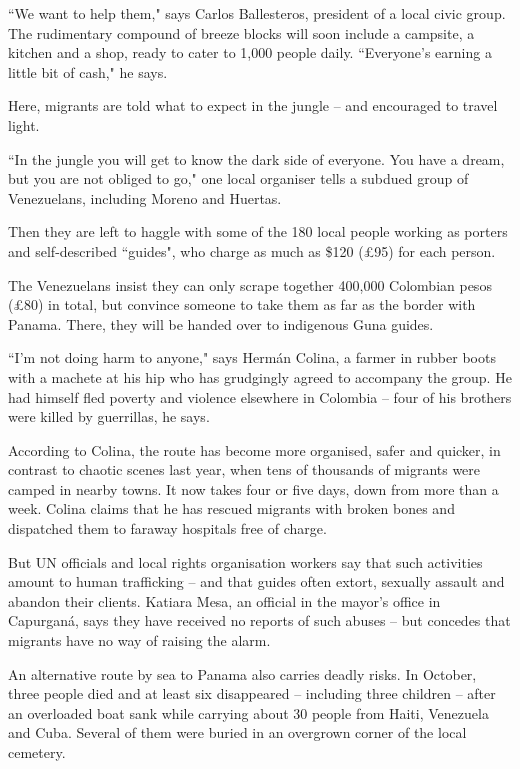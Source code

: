 \documentclass[10pt,a4paper]{article}
\newcommand{\qm}[1]{``#1"}
\begin{document}
\qm{We want to help them,} says Carlos Ballesteros, president of a local civic group. The rudimentary compound of breeze blocks will soon include a campsite, a kitchen and a shop, ready to cater to 1,000 people daily. \qm{Everyone's earning a little bit of cash,} he says.

Here, migrants are told what to expect in the jungle -- and encouraged to travel light.

\qm{In the jungle you will get to know the dark side of everyone. You have a dream, but you are not obliged to go,} one local organiser tells a subdued group of Venezuelans, including Moreno and Huertas.

Then they are left to haggle with some of the 180 local people working as porters and self-described \qm{guides}, who charge as much as \$120 (£95) for each person.

The Venezuelans insist they can only scrape together 400,000 Colombian pesos (£80) in total, but convince someone to take them as far as the border with Panama. There, they will be handed over to indigenous Guna guides.

\qm{I'm not doing harm to anyone,} says Hermán Colina, a farmer in rubber boots with a machete at his hip who has grudgingly agreed to accompany the group. He had himself fled poverty and violence elsewhere in Colombia -- four of his brothers were killed by guerrillas, he says.

According to Colina, the route has become more organised, safer and quicker, in contrast to chaotic scenes last year, when tens of thousands of migrants were camped in nearby towns. It now takes four or five days, down from more than a week. Colina claims that he has rescued migrants with broken bones and dispatched them to faraway hospitals free of charge.

But UN officials and local rights organisation workers say that such activities amount to human trafficking -- and that guides often extort, sexually assault and abandon their clients. Katiara Mesa, an official in the mayor's office in Capurganá, says they have received no reports of such abuses -- but concedes that migrants have no way of raising the alarm.

An alternative route by sea to Panama also carries deadly risks. In October, three people died and at least six disappeared -- including three children -- after an overloaded boat sank while carrying about 30 people from Haiti, Venezuela and Cuba. Several of them were buried in an overgrown corner of the local cemetery.
\end{document}
